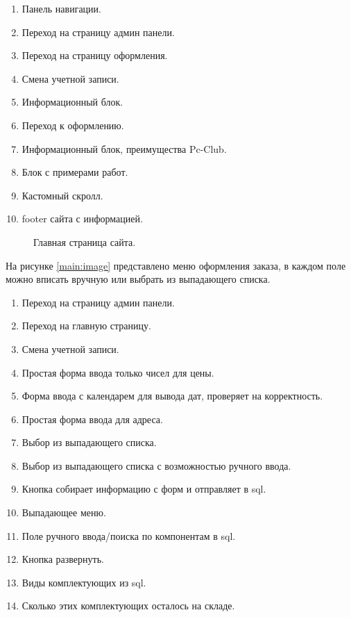\begin{enumerate}
	\item Панель навигации.
	\item Переход на страницу админ панели.
	\item Переход на страницу оформления.
	\item Смена учетной записи.
	\item Информационный блок.
	\item Переход к оформлению.
	\item Информационный блок, преимущества Pc-Club.
	\item Блок с примерами работ.
	\item Кастомный скролл.
	\item footer сайта с информацией.
\end{enumerate}

\begin{figure}[ht]
\caption{Главная страница сайта.}
\label{index:image}
\end{figure}

\newpage 
На рисунке \ref{main:image} представлено меню оформления заказа,  в каждом поле можно вписать вручную или выбрать из выпадающего списка.
\begin{enumerate}
	\item Переход на страницу админ панели.
	\item Переход на главную страницу.
	\item Смена учетной записи.
	\item Простая форма ввода только чисел для цены.
	\item Форма ввода с календарем для вывода дат, проверяет на корректность.
	\item Простая форма ввода для адреса.
	\item Выбор из выпадающего списка.
	\item Выбор из выпадающего списка с возможностью ручного ввода.
	\item Кнопка собирает информацию с форм и отправляет в sql.
	\item Выпадающее меню.
	\item Поле ручного ввода/поиска по компонентам в sql.
	\item Кнопка развернуть.
	\item Виды комплектующих из sql.
	\item Сколько этих комплектующих осталось на складе.
\end{enumerate}

